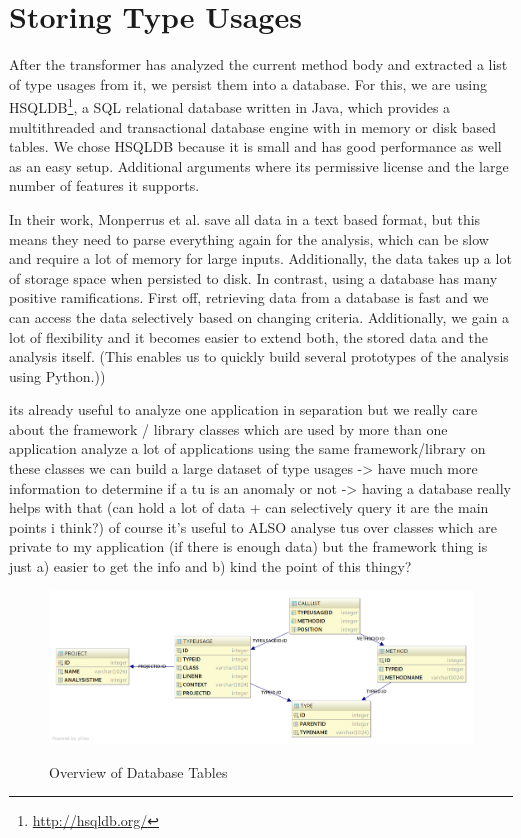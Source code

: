 \section{Storing Type Usages}

After the transformer has analyzed the current method body and extracted a list of type usages from it, we persist them into a database.
For this, we are using HSQLDB\footnote{\url{http://hsqldb.org/}}, a SQL relational database written in Java, which provides a multithreaded and transactional database engine with in memory or disk based tables.
We chose HSQLDB because it is small and has good performance as well as an easy setup.
Additional arguments where its permissive license and the large number of features it supports.

In their work, Monperrus et al. save all data in a text based format, but this means they need to parse everything again for the analysis, which can be slow and require a lot of memory for large inputs.
Additionally, the data takes up a lot of storage space when persisted to disk.
In contrast, using a database has many positive ramifications.
First off, retrieving data from a database is fast and we can access the data selectively based on changing criteria.
Additionally, we gain a lot of flexibility and it becomes easier to extend both, the stored data and the analysis itself.
(This enables us to quickly build several prototypes of the analysis using Python.))

its already useful to analyze one application in separation
but we really care about the framework / library classes which are used by more than one application
analyze a lot of applications using the same framework/library
on these classes we can build a large dataset of type usages -> have much more information to determine if a tu is an anomaly or not
-> having a database really helps with that (can hold a lot of data + can selectively query it are the main points i think?)
of course it's useful to ALSO analyse tus over classes which are private to my application (if there is enough data)
    but the framework thing is just a) easier to get the info and b) kind the point of this thingy?

\begin{figure}[h]
    \centering
    \includegraphics[width=\textwidth]{figures/database_layout-light}
    \label{fig:db_layout}
    \caption{Overview of Database Tables}
\end{figure}

